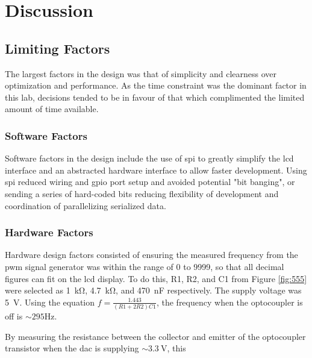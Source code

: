 
\section{Discussion}
\subsection{Limiting Factors}
The largest factors in the design was that of simplicity and clearness
over optimization and performance. As the time constraint was the
dominant factor in this lab, decisions tended to be in favour of that
which complimented the limited amount of time available.

\subsubsection{Software Factors}
Software factors in the design include the use of \gls{spi} to greatly
simplify the \gls{lcd} interface and an abstracted hardware interface to
allow faster development. Using \gls{spi} reduced wiring and \gls{gpio}
port setup and avoided potential "bit banging", or sending a series of
hard-coded bits reducing flexibility of development and coordination of
parallelizing serialized data. \\

\subsubsection{Hardware Factors}
Hardware design factors consisted of ensuring the measured frequency
from the \gls{pwm} signal generator was within the range of 0 to 9999,
so that all decimal figures can fit on the \gls{lcd} display. To do
this, R1, R2, and C1 from Figure \ref{fig:555} were selected as
\SI{1}{\kilo \ohm}, \SI{4.7}{\kilo \ohm}, and \SI{470}{\nano \farad}
respectively. The supply voltage was \SI{5}{\volt}. Using the equation
$f = \frac{1.443}{(R1 + 2R2)C1}$, the frequency when the optocoupler is
off is $\sim 295\si{\hertz}$.

By measuring the resistance between the collector and emitter of the
optocoupler transistor when the \gls{dac} is supplying $\sim\SI{3.3}{\volt}$, this 

